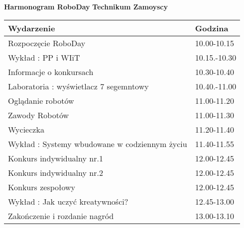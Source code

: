 \documentclass{article}
\begin{document}
\begin{center}
\Large\textbf{Harmonogram RoboDay}
\large\textbf{Technikum Zamoyscy}
\end{center}
\vspace{1cm}
\begin{center}
\begin{tabular}{|l|l|}
\hline
\textbf{Wydarzenie} & \textbf{Godzina} \\
\hline
Rozpoczęcie RoboDay & 10.00-10.15 \\
\hline
Wykład : PP i WIiT & 10.15.-10.30 \\
\hline
Informacje o konkursach & 10.30-10.40 \\
\hline
Laboratoria : wyświetlacz 7 segemntowy & 10.40.-11.00 \\
\hline
Oglądanie robotów & 11.00-11.20 \\
\hline
Zawody Robotów & 11.00-11.30 \\
\hline
Wycieczka & 11.20-11.40 \\
\hline
Wykład : Systemy wbudowane w codziennym życiu & 11.40-11.55 \\
\hline
Konkurs indywidualny nr.1 & 12.00-12.45 \\
\hline
Konkurs indywidualny nr.2 & 12.00-12.45 \\
\hline
Konkurs zespołowy & 12.00-12.45 \\
\hline
Wykład : Jak uczyć kreatywności? & 12.45-13.00 \\
\hline
Zakończenie i rozdanie nagród & 13.00-13.10 \\
\hline
\end{tabular}
\end{center}
\end{document}
